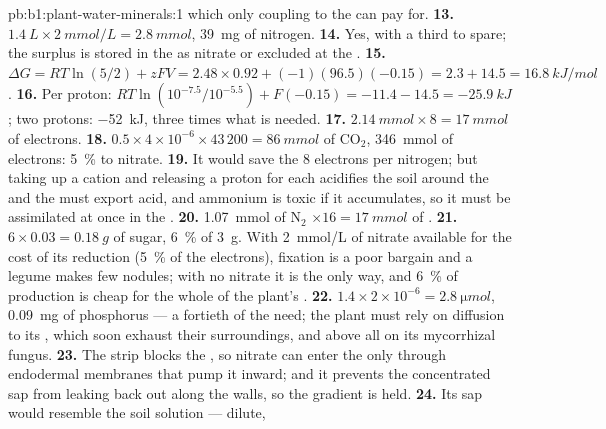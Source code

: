 \begin{solution}{pb:b1:plant-water-minerals:1}
which only coupling to the  can pay for.
\textbf{13.} $\qty{1.4}{L}\times\qty{2}{mmol/L} = \qty{2.8}{mmol}$,
\qty{39}{mg} of nitrogen.
\textbf{14.} Yes, with a third to spare; the surplus is stored in the
 as nitrate or excluded at the .
\textbf{15.} $\Delta G = RT\ln(5/2) + zFV = 2.48\times 0.92 + (-1)(96.5)(-0.15)
= 2.3 + 14.5 = \qty{16.8}{kJ/mol}$.
\textbf{16.} Per proton: $RT\ln(10^{-7.5}/10^{-5.5}) + F(-0.15) =
-11.4 - 14.5 = \qty{-25.9}{kJ}$; two protons: \qty{-52}{kJ}, three
times what is needed.
\textbf{17.} $\qty{2.14}{mmol}\times 8 = \qty{17}{mmol}$ of electrons.
\textbf{18.} $0.5\times 4\times 10^{-6}\times 43\,200 = \qty{86}{mmol}$
of $\mathrm{CO_2}$, \qty{346}{mmol} of electrons: \qty{5}{\%} to
nitrate.
\textbf{19.} It would save the 8 electrons per nitrogen; but taking
up a cation and releasing a proton for each acidifies the soil around
the  and the  must export acid, and ammonium is toxic if it
accumulates, so it must be assimilated at once in the .
\textbf{20.} \qty{1.07}{mmol} of $\mathrm{N_2}$ $\times 16 =
\qty{17}{mmol}$ of .
\textbf{21.} $6\times 0.03 = \qty{0.18}{g}$ of sugar, \qty{6}{\%} of
\qty{3}{g}. With \qty{2}{mmol/L} of nitrate available for the cost of
its reduction (\qty{5}{\%} of the electrons), fixation is a poor
bargain and a legume makes few nodules; with no nitrate it is the only
way, and \qty{6}{\%} of production is cheap for the whole of the
plant's .
\textbf{22.} $1.4\times 2\times 10^{-6} = \qty{2.8}{\micro mol}$,
\qty{0.09}{mg} of phosphorus --- a fortieth of the need; the plant
must rely on diffusion to its , which soon exhaust their
surroundings, and above all on its mycorrhizal fungus.
\textbf{23.} The strip blocks the , so nitrate can enter the
 only through endodermal membranes that pump it inward; and it
prevents the concentrated  sap from leaking back out along the
walls, so the gradient is held.
\textbf{24.} Its  sap would resemble the soil solution --- dilute,

\end{solution}
